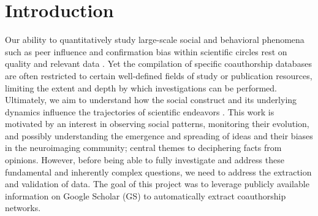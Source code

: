 \documentclass[twocolumn]{bmcart}%
\begin{document}
\begin{frontmatter}
\begin{fmbox}

	








%
\end{fmbox}%

\end{frontmatter}


\section{Introduction}\label{introduction}

Our ability to quantitatively study large-scale social and behavioral
phenomena such as peer influence and confirmation bias within scientific
circles rest on quality and relevant data
\cite{BiologicalNetworks:Freeman2004}. Yet the compilation of specific
coauthorship databases are often restricted to certain well-defined
fields of study or publication resources, limiting the extent and depth
by which investigations can be performed. Ultimately, we aim to
understand how the social construct and its underlying dynamics
influence the trajectories of scientific endeavors
\cite{Sarigol2014:PredictingSuccess}. This work is motivated by an
interest in observing social patterns, monitoring their evolution, and
possibly understanding the emergence and spreading of ideas and their
biases in the neuroimaging community; central themes to deciphering
facts from opinions. However, before being able to fully investigate and
address these fundamental and inherently complex questions, we need to
address the extraction and validation of data. The goal of this project
was to leverage publicly available information on Google Scholar (GS) to
automatically extract coauthorship networks.
\end{document}
